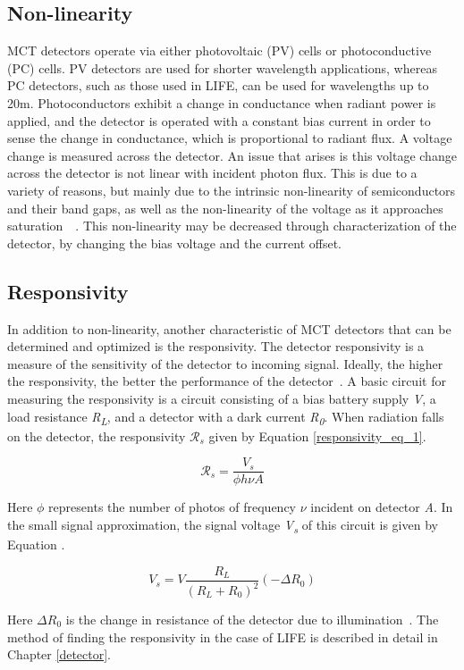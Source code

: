 \subsection{Non-linearity}
MCT detectors operate via either photovoltaic (PV) cells or photoconductive (PC) cells. PV detectors are used for shorter wavelength applications, whereas PC detectors, such as those used in LIFE, can be used for wavelengths up to 20\textmu m. Photoconductors exhibit a change in conductance when radiant power is applied, and the detector is operated with a constant bias current in order to sense the change in conductance, which is proportional to radiant flux. A voltage change is measured across the detector. An issue that arises is this voltage change across the detector is not linear with incident photon flux. This is due to a variety of reasons, but mainly due to the intrinsic non-linearity of semiconductors and their band gaps, as well as the non-linearity of the voltage as it approaches saturation~\cite{current_measurement_MCTs}~\cite{MCT_linearity}.  This non-linearity may be decreased through characterization of the detector, by changing the bias voltage and the current offset.

\subsection {Responsivity}
In addition to non-linearity, another characteristic of MCT detectors that can be determined and optimized is the responsivity. The detector responsivity is a measure of the sensitivity of the detector to incoming signal. Ideally, the higher the responsivity, the better the performance of the detector~\cite{GLORIA_PhD}. A basic circuit for measuring the responsivity is a circuit consisting of a bias battery supply \textit{V}, a load resistance \textit{R\textsubscript{L}}, and a detector with a dark current \textit{R\textsubscript{0}}. When radiation falls on the detector, the responsivity $\mathcal{R}_s$ given by Equation \ref{responsivity_eq_1}.

\begin{equation} \label{responsivity_eq_1}
    \mathcal{R}_s = \frac{V_s}{\phi h \nu A}
\end{equation}

Here $\phi$ represents the number of photos of frequency $\nu$ incident on detector \textit{A}. In the small signal approximation, the signal voltage \textit{V\textsubscript{s}} of this circuit is given by Equation .

\begin{equation}
    V_s = V \frac{R_L}{(R_L+R_0)^2}(-\Delta R_0)
\end{equation}

Here $\Delta R_0$ is the change in resistance of the detector due to illumination~\cite{MCT_responsivity}. The method of finding the responsivity in the case of LIFE is described in detail in Chapter \ref{detector}.